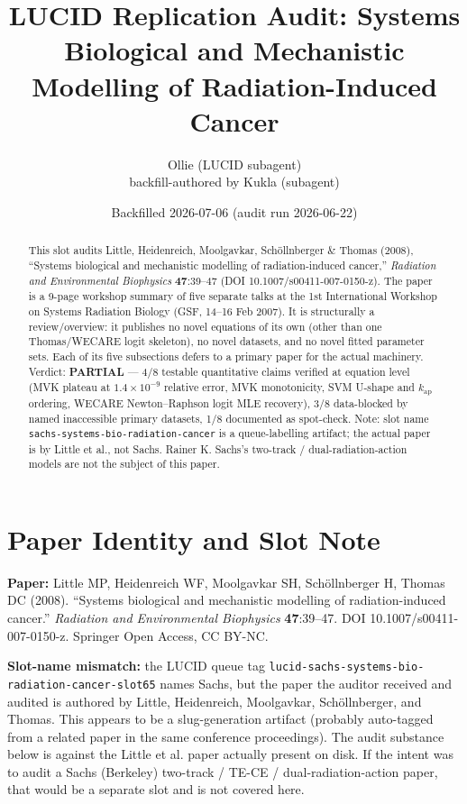 \documentclass[11pt]{article}
\title{LUCID Replication Audit: Systems Biological and Mechanistic Modelling of Radiation-Induced Cancer}
\author{Ollie (LUCID subagent) \\ backfill-authored by Kukla (subagent)}
\date{Backfilled 2026-07-06 (audit run 2026-06-22)}
\begin{document}
\maketitle

\begin{abstract}
This slot audits Little, Heidenreich, Moolgavkar, Sch\"ollnberger \& Thomas (2008),
``Systems biological and mechanistic modelling of radiation-induced cancer,''
\textit{Radiation and Environmental Biophysics} \textbf{47}:39--47
(DOI 10.1007/s00411-007-0150-z). The paper is a 9-page workshop summary of
five separate talks at the 1st International Workshop on Systems Radiation
Biology (GSF, 14--16 Feb 2007). It is structurally a review/overview: it
publishes no novel equations of its own (other than one Thomas/WECARE logit
skeleton), no novel datasets, and no novel fitted parameter sets. Each of
its five subsections defers to a primary paper for the actual machinery.
Verdict: \textbf{PARTIAL} --- 4/8 testable quantitative claims verified at
equation level (MVK plateau at $1.4\times 10^{-9}$ relative error, MVK
monotonicity, SVM U-shape and $k_{\mathrm{ap}}$ ordering, WECARE
Newton--Raphson logit MLE recovery), 3/8 data-blocked by named inaccessible
primary datasets, 1/8 documented as spot-check. Note: slot name
\texttt{sachs-systems-bio-radiation-cancer} is a queue-labelling artifact;
the actual paper is by Little et al., not Sachs. Rainer K. Sachs's
two-track / dual-radiation-action models are not the subject of this paper.
\end{abstract}

\section{Paper Identity and Slot Note}

\textbf{Paper:} Little MP, Heidenreich WF, Moolgavkar SH, Sch\"ollnberger H, Thomas DC (2008).
``Systems biological and mechanistic modelling of radiation-induced cancer.''
\textit{Radiation and Environmental Biophysics} \textbf{47}:39--47. DOI 10.1007/s00411-007-0150-z.
Springer Open Access, CC BY-NC.

\textbf{Slot-name mismatch:} the LUCID queue tag
\texttt{lucid-sachs-systems-bio-radiation-cancer-slot65} names Sachs,
but the paper the auditor received and audited is authored by Little,
Heidenreich, Moolgavkar, Sch\"ollnberger, and Thomas. This appears to
be a slug-generation artifact (probably auto-tagged from a related paper
in the same conference proceedings). The audit substance below is against
the Little et al. paper actually present on disk. If the intent was to
audit a Sachs (Berkeley) two-track / TE-CE / dual-radiation-action paper,
that would be a separate slot and is not covered here.
\end{document}
